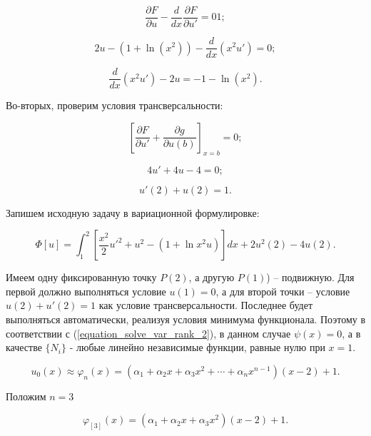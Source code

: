 \documentclass{article}
\begin{document}
\begin{displaymath}
	\frac{\partial F}{\partial u} - \frac{d}{dx} \frac{\partial F}{\partial u'} = 01;
\end{displaymath}

\begin{displaymath}
	2u - (1 + \ln(x^2)) - \frac{d}{dx}(x^2 u') = 0;
\end{displaymath}

\begin{displaymath}
	\frac{d}{dx}(x^2 u') - 2u = -1 - \ln(x^2).
\end{displaymath}

Во-вторых, проверим условия трансверсальности:

\begin{displaymath}
	\left[ \frac{\partial F}{\partial u'} + \frac{\partial g}{\partial u(b)} \right] _{x=b} = 0;
\end{displaymath}

\begin{displaymath}
	4u' + 4u - 4 = 0;
\end{displaymath}

\begin{displaymath}
	u'(2) + u(2) = 1.
\end{displaymath}

Запишем исходную задачу в вариационной формулировке:

\begin{equation}\label{equation_functional_rank_3}
	\Phi[u] = \int_{1}^{2} \left[ \frac{x^2}{2}u'^2 + u^2 - (1 + \ln{x^2}u) \right] dx + 2u^2(2) - 4u(2).
\end{equation}

Имеем одну фиксированную точку $P(2)$, а другую $P(1)$) – подвижную. Для первой должно выполняться условие $u(1) = 0$, а для второй точки – условие $u(2) + u'(2) = 1$ как условие трансверсальности. Последнее будет выполняться автоматически, реализуя условия минимума функционала. Поэтому в соответствии с (\ref{equation_solve_var_rank_2}), в данном случае $\psi(x) = 0$, а в качестве $\lbrace N_{i} \rbrace$ - любые линейно независимые функции, равные нулю при $x = 1$.

\begin{displaymath}
	u_{0}(x) \approx \varphi_{n}(x) = (\alpha_{1} + \alpha_{2}x + \alpha_{3}x^2 + \cdots + \alpha_{n}x^{n-1})(x-2)+1.
\end{displaymath}

\noindent Положим $n = 3$

\begin{displaymath}
	\varphi_{[3]}(x) = (\alpha_{1} + \alpha_{2}x + \alpha_{3}x^2)(x-2)+1.
\end{displaymath}
\end{document}
